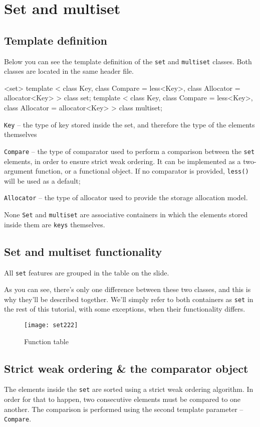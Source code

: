 \section{Set and multiset} %
\subsection{Template definition} %
Below you can see the template definition of the \texttt{set} and \texttt{multiset} classes. 
Both classes are located in the same header file.
\begin{methodinfo}
  {<set>}
  {template < class Key, class Compare = less<Key>, class Allocator = allocator<Key> > class set;
  template < class Key, class Compare = less<Key>, class Allocator = allocator<Key> > class multiset;}
  {\texttt{Key} – the type of key stored inside the set, and therefore the type of the elements themselves

  \texttt{Compare} – the type of comparator used to perform a comparison between the \texttt{set} elements, 
  in order to ensure strict weak ordering. It can be implemented as a two-argument function, 
  or a functional object. If no comparator is provided, \texttt{less()} will be used as a default;

  \texttt{Allocator} – the type of allocator used to provide the storage allocation model.}
  {None}
  {\texttt{Set} and \texttt{multiset} are associative containers in which the elements stored 
  inside them are \texttt{keys} themselves.}
\end{methodinfo}

\subsection{Set and multiset functionality} %
All \texttt{set} features are grouped in the table on the slide.

As you can see, there’s only one difference between these two classes, and this is why they’ll be 
described together. We’ll simply refer to both containers as \texttt{set} in the rest of this tutorial, 
with some exceptions, when their functionality differs.
\begin{figure}[htbp!]
  \centering
  \texttt{[image: set222]}
  \caption[function]{Function table}
  \label{fig:function set}
\end{figure}

\subsection{Strict weak ordering \& the comparator object} %
The elements inside the \texttt{set} are sorted using a strict weak ordering algorithm. 
In order for that to happen, two consecutive elements must be compared to one another. 
The comparison is performed using the second template parameter – \texttt{Compare}.

